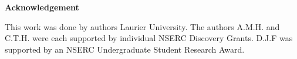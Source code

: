 \documentclass[12pt]{article}
\begin{document}
\begin{center}
{\bf Acknowledgement}
\end{center}
This work was done by authors  Laurier University. The authors A.M.H. and C.T.H. were each supported by individual NSERC Discovery Grants. D.J.F was supported by an NSERC Undergraduate Student Research Award.


\clearpage
\begin{thebibliography}{99}

\end{thebibliography}
\end{document}
